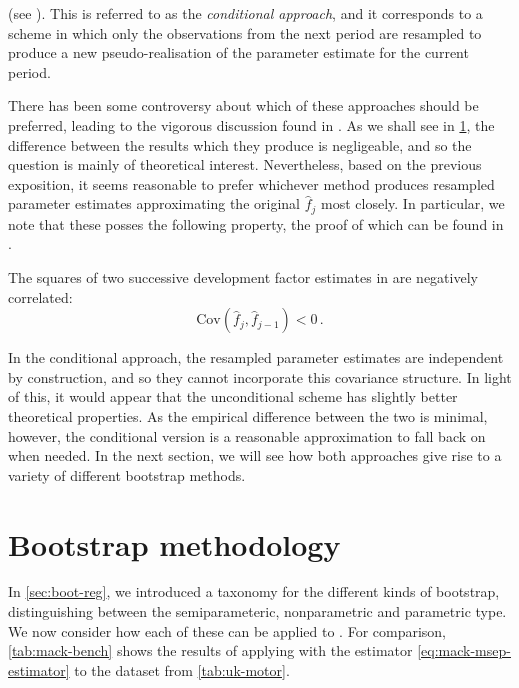 \documentclass[a4paper]{book}
\begin{document}
(see \cite[46]{wuthrich:stochastic-reserving}). This is referred to as the \emph{conditional approach}, and it corresponds to a scheme in which only the observations from the next period are resampled to produce a new pseudo-realisation of the parameter estimate for the current period.

There has been some controversy about which of these approaches should be preferred, leading to the vigorous discussion found in \cite{wuthrich:chain-ladder-msep, mack:msep, gisler:msep, venter:msep}. As we shall see in \cref{sec:mack-boot}, the difference between the results which they produce is negligeable, and so the question is mainly of theoretical interest. Nevertheless, based on the previous exposition, it seems reasonable to prefer whichever method produces resampled parameter estimates approximating the original $\widehat{f}_j$ most closely. In particular, we note that these posses the following property, the proof of which can be found in \cite{mack:msep}.

\begin{theorem}
  The squares of two successive development factor estimates in  are negatively correlated:
  \begin{equation}
    \mathrm{Cov}(\widehat{f}_j, \widehat{f}_{j - 1}) < 0 \,.
  \end{equation}
\end{theorem}

\noindent In the conditional approach, the resampled parameter estimates are independent by construction, and so they cannot incorporate this covariance structure. In light of this, it would appear that the unconditional scheme has slightly better theoretical properties. As the empirical difference between the two is minimal, however, the conditional version is a reasonable approximation to fall back on when needed. In the next section, we will see how both approaches give rise to a variety of different bootstrap methods.

\section{Bootstrap methodology} \label{sec:mack-boot}

In \cref{sec:boot-reg}, we introduced a taxonomy for the different kinds of bootstrap, distinguishing between the semiparameteric, nonparametric and parametric type. We now consider how each of these can be applied to . For comparison, \cref{tab:mack-bench} shows the results of applying  with the estimator \cref{eq:mack-msep-estimator} to the dataset from \cref{tab:uk-motor}.
\end{document}
